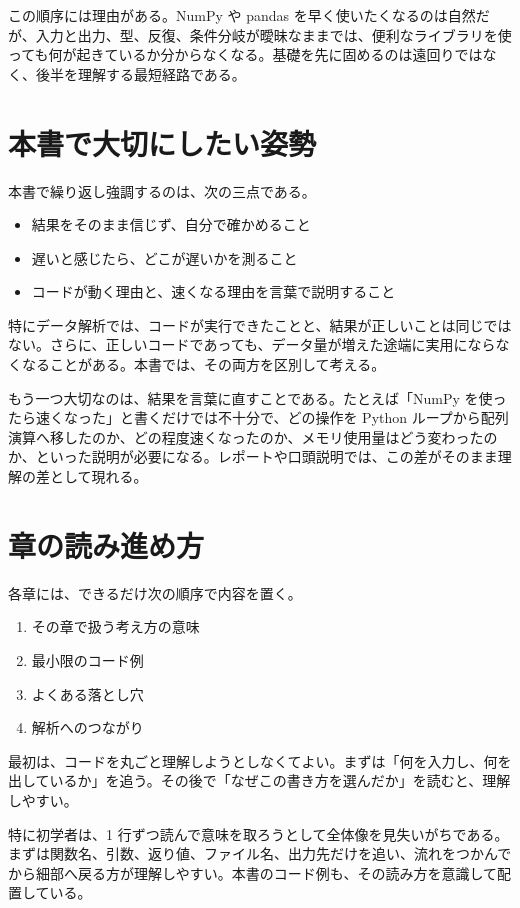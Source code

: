 この順序には理由がある。NumPy や pandas を早く使いたくなるのは自然だが、入力と出力、型、反復、条件分岐が曖昧なままでは、便利なライブラリを使っても何が起きているか分からなくなる。基礎を先に固めるのは遠回りではなく、後半を理解する最短経路である。

\section{本書で大切にしたい姿勢}

本書で繰り返し強調するのは、次の三点である。

\begin{itemize}
\item 結果をそのまま信じず、自分で確かめること
\item 遅いと感じたら、どこが遅いかを測ること
\item コードが動く理由と、速くなる理由を言葉で説明すること
\end{itemize}

特にデータ解析では、コードが実行できたことと、結果が正しいことは同じではない。さらに、正しいコードであっても、データ量が増えた途端に実用にならなくなることがある。本書では、その両方を区別して考える。

もう一つ大切なのは、結果を言葉に直すことである。たとえば「NumPy を使ったら速くなった」と書くだけでは不十分で、どの操作を Python ループから配列演算へ移したのか、どの程度速くなったのか、メモリ使用量はどう変わったのか、といった説明が必要になる。レポートや口頭説明では、この差がそのまま理解の差として現れる。

\section{章の読み進め方}

各章には、できるだけ次の順序で内容を置く。

\begin{enumerate}
\item その章で扱う考え方の意味
\item 最小限のコード例
\item よくある落とし穴
\item 解析へのつながり
\end{enumerate}

最初は、コードを丸ごと理解しようとしなくてよい。まずは「何を入力し、何を出しているか」を追う。その後で「なぜこの書き方を選んだか」を読むと、理解しやすい。

特に初学者は、1 行ずつ読んで意味を取ろうとして全体像を見失いがちである。まずは関数名、引数、返り値、ファイル名、出力先だけを追い、流れをつかんでから細部へ戻る方が理解しやすい。本書のコード例も、その読み方を意識して配置している。


